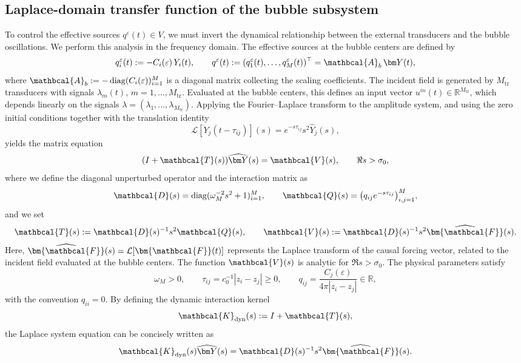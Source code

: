 \documentclass[11pt,a4paper]{article}
\numberwithin{equation}{section}
\begin{document}
\subsection{Laplace-domain transfer function of the bubble subsystem}
\noindent
To control the effective sources $q^\varepsilon(t) \in V$, we must invert the dynamical relationship between the external transducers and the bubble oscillations. We perform this analysis in the frequency domain.  The effective sources at the bubble centers are defined by
\[
q_i^\varepsilon(t) := -C_i(\varepsilon)\,Y_i(t),\qquad q^\varepsilon(t) := (q_1^\varepsilon(t),\dots,q_M^\varepsilon(t))^\top = \mathbcal{A}_b\,\bm Y(t),
\]
where $\mathbcal{A}_b := -\operatorname{diag}(C_i(\varepsilon))_{i=1}^M$ is a diagonal matrix collecting the scaling coefficients.
\newline
The incident field is generated by $M_{\mathrm{tr}}$ transducers with signals $\lambda_m(t)$, $m=1,\dots,M_{\mathrm{tr}}$. Evaluated at the bubble centers, this defines an input vector $u^{\textit{in}}(t)\in\mathbb{R}^{M_{\mathrm{tr}}}$, which depends linearly on the signals $\lambda = (\lambda_1,\dots,\lambda_{M_{\mathrm{tr}}})$.
\newline
Applying the Fourier--Laplace transform to the amplitude system, and using the zero initial conditions together with the translation identity
\[
\mathcal{L}[\ddot Y_j(t-\tau_{ij})](s) = e^{-s\tau_{ij}} s^2 \widehat Y_j(s),
\]
yields the matrix equation
\[
(I+\mathbcal{T}(s))\widehat{\bm Y}(s) = \mathbcal{V}(s), \qquad \Re s > \sigma_0,
\]
where we define the diagonal unperturbed operator and the interaction matrix as
\[
\mathbcal{D}(s) = \operatorname{diag}(\omega_M^{-2} s^2+1)_{i=1}^M, \qquad \mathbcal{Q}(s) = \bigl(q_{ij}e^{-s\tau_{ij}}\bigr)_{i,j=1}^M,
\]
and we set
\[
\mathbcal{T}(s) := \mathbcal{D}(s)^{-1}s^2 \mathbcal{Q}(s), \qquad \mathbcal{V}(s) := \mathbcal{D}(s)^{-1}s^2 \widehat{\bm{\mathbcal{F}}}(s).
\]
Here, $\widehat{\bm{\mathbcal{F}}}(s) = \mathcal{L}[\bm{\mathbcal{F}}(t)]$ represents the Laplace transform of the causal forcing vector, related to the incident field evaluated at the bubble centers. The function $\mathbcal{V}(s)$ is analytic for $\Re s > \sigma_0$. The physical parameters satisfy
\[
\omega_M > 0,\qquad \tau_{ij} = c_0^{-1}|z_i - z_j| \ge 0,\qquad q_{ij} = \frac{C_j(\varepsilon)}{4\pi |z_i - z_j|} \in \mathbb R,
\]
with the convention $q_{ii}=0$. By defining the dynamic interaction kernel
\[
\mathbcal{K}_{\mathrm{dyn}}(s) := I + \mathbcal{T}(s),
\]
the Laplace system equation can be concisely written as
\[
\mathbcal{K}_{\mathrm{dyn}}(s)\widehat{\bm Y}(s) = \mathbcal{D}(s)^{-1}s^2 \widehat{\bm{\mathbcal{F}}}(s).
\]
\end{document}
